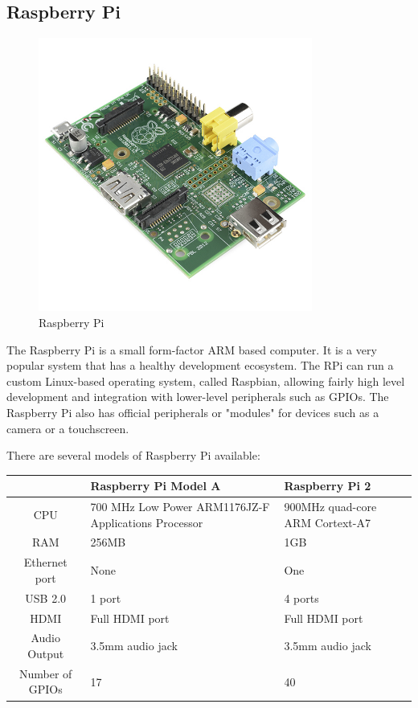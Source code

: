 \documentclass[10pt]{article}
\begin{document}
\subsection{Raspberry Pi}

\begin{figure}[h]
\centering
\caption{Raspberry Pi}
\label{Raspberry Pi}
\includegraphics[height=9cm]{images/Raspberry-Pi.jpg}
\end{figure}
The Raspberry Pi is a small form-factor ARM based computer. It is a very popular system that has a healthy development ecosystem. The RPi can run a custom Linux-based operating system, called Raspbian, allowing fairly high level development and integration with lower-level peripherals such as GPIOs. The Raspberry Pi also has official peripherals or "modules" for devices such as a camera or a touchscreen.

There are several models of Raspberry Pi available:

\begin{center}
	\begin{tabular}{| c | p{6cm} | p{6cm} |}
		\hline
		  & Raspberry Pi Model A & Raspberry Pi 2 \\ \hline
		CPU & 700 MHz Low Power ARM1176JZ-F Applications Processor & 900MHz quad-core ARM Cortext-A7 \\ \hline
		RAM & 256MB & 1GB \\ \hline
		Ethernet port & None & One \\ \hline
		USB 2.0 & 1 port & 4 ports \\ \hline
		HDMI & Full HDMI port & Full HDMI port \\ \hline
		Audio Output & 3.5mm audio jack & 3.5mm audio jack \\ \hline
		Number of GPIOs & 17 & 40 \\ \hline
	\end{tabular}
\end{center}
\end{document}
